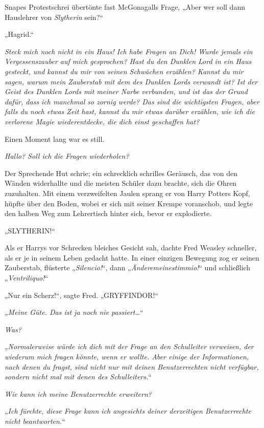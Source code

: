 Snapes Protestschrei übertönte fast McGonagalls Frage, „Aber wer soll dann Hauslehrer von \emph{Slytherin} sein?“

„Hagrid.“

\later

\emph{Steck mich noch nicht in ein Haus! Ich habe Fragen an Dich! Wurde jemals ein Vergessenszauber auf mich gesprochen? Hast du den Dunklen Lord in ein Haus gesteckt, und kannst du mir von seinen Schwächen erzählen? Kannst du mir sagen, warum mein Zauberstab mit dem des Dunklen Lords verwandt ist? Ist der Geist des Dunklen Lords mit meiner Narbe verbunden, und ist das der Grund dafür, dass ich manchmal so zornig werde? Das sind die wichtigsten Fragen, aber falls du noch etwas Zeit hast, kannst du mir etwas darüber erzählen, wie ich die verlorene Magie wiederentdecke, die dich einst geschaffen hat?}

Einen Moment lang war es still.

\emph{Hallo? Soll ich die Fragen wiederholen?}

Der Sprechende Hut schrie; ein schrecklich schrilles Geräusch, das von den Wänden widerhallte und die meisten Schüler dazu brachte, sich die Ohren zuzuhalten. Mit einem verzweifelten Jaulen sprang er von Harry Potters Kopf, hüpfte über den Boden, wobei er sich mit seiner Krempe voranschob, und legte den halben Weg zum Lehrertisch hinter sich, bevor er explodierte.

\later

„SLYTHERIN!“

Als er Harrys vor Schrecken bleiches Gesicht sah, dachte Fred Weasley schneller, als er je in seinem Leben gedacht hatte. In einer einzigen Bewegung zog er seinen Zauberstab, flüsterte „\emph{Silencio!}“, dann „\emph{Änderemeinestimmio!}“ und schließlich „\emph{Ventriliquo!}“

„Nur ein Scherz!“, sagte Fred. „GRYFFINDOR!“

\later

„\emph{Meine Güte. Das ist ja noch nie passiert…}“

\emph{Was?}

„\emph{Normalerweise würde ich dich mit der Frage an den Schulleiter verweisen, der wiederum mich fragen könnte, wenn er wollte. Aber einige der Informationen, nach denen du fragst, sind nicht nur mit deinen Benutzerrechten nicht verfügbar, sondern nicht mal mit denen des Schulleiters.}“

\emph{Wie kann ich meine Benutzerrechte erweitern?}

„\emph{Ich fürchte, diese Frage kann ich angesichts deiner derzeitigen Benutzerrechte nicht beantworten.}“


